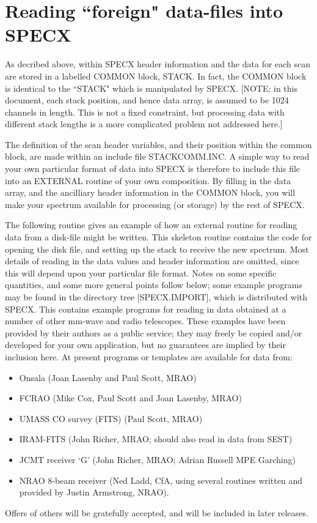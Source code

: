 \documentclass[11pt,twoside]{report}
\begin{document}
\section{Reading ``foreign" data-files into SPECX}

As decribed above, within SPECX header information and the data for
each scan are stored in a labelled COMMON block, STACK. In fact, the
COMMON block is identical to the ``STACK" which is manipulated by
SPECX. [NOTE: in this document, each stack position, and hence data
array, is assumed to be 1024 channels in length. This is not a fixed
constraint, but processing data with different stack lengths is a more
complicated problem not addressed here.] 

The definition of the scan header variables, and their position within the
common block, are made within an include file
STACKCOMM.INC. A simple way to read your own particular
format of data into SPECX is therefore to include this file into an EXTERNAL
routine of your own composition. By filling in the data array, and the
ancilliary header information in the COMMON block, you will make your spectrum
available for processing (or storage) by the rest of SPECX.

The following routine gives an example of how an external routine for
reading data from a disk-file might be written. This skeleton routine
contains the code for opening the disk file, and setting up the stack
to receive the new spectrum. Most details of reading in the data
values and header information are omitted, since this will depend upon your
particular file format. Notes on some specific quantities, and some more
general points follow below; some example programs may be found in the
directory tree [SPECX.IMPORT], which is distributed with SPECX.
This contains example programs for reading in data obtained at a
number of other mm-wave and radio telescopes. These examples have been
provided by their authors as a public service; they may freely be copied
and/or developed for your own application, but no guarantees are implied
by their inclusion here. At present programs or templates are available for
data from:
\begin{itemize}
   \item Onsala (Joan Lasenby and Paul Scott, MRAO)
   \item FCRAO (Mike Cox, Paul Scott and Joan Lasenby, MRAO)
   \item UMASS CO survey (FITS) (Paul Scott, MRAO)
   \item IRAM-FITS (John Richer, MRAO; should also read in data from SEST)
   \item JCMT receiver `G' (John Richer, MRAO; Adrian Russell MPE Garching)
   \item NRAO 8-beam receiver (Ned Ladd, CfA, using several routines
         written and provided by Justin Armstrong, NRAO).
\end{itemize}
Offers of others will be gratefully accepted, and will be included in later
releases.
\end{document}
